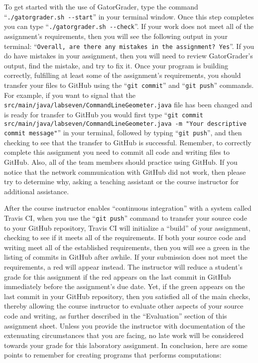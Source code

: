 \documentclass[11pt]{article}
\newcommand{\mainprogramsource}{\lstinline{src/main/java/labseven/CommandLineGeometer.java}}
\newcommand{\gatorgraderstart}{\command{./gatorgrader.sh --start}}
\newcommand{\gatorgradercheck}{\command{./gatorgrader.sh --check}}
\newcommand{\gitcommit}{\command{git commit}}
\newcommand{\gitpush}{\command{git push}}
\newcommand{\gitcommitmainprogram}{\command{git commit src/main/java/labseven/CommandLineGeometer.java -m "Your
descriptive commit message"}}
\newcommand{\command}[1]{``\lstinline{#1}''}
\newcommand{\step}[1]{``{#1}''}
\newcommand{\checkmark}{\ding{51}}
\newcommand{\naughtmark}{\ding{55}}
\begin{document}
To get started with the use of GatorGrader, type the command \gatorgraderstart{} in your terminal window. Once this step
completes you can type \gatorgradercheck{}. If your work does not meet all of the assignment's requirements, then you
will see the following output in your terminal: \command{Overall, are there any mistakes in the assignment? Yes}. If you
do have mistakes in your assignment, then you will need to review GatorGrader's output, find the mistake, and try to fix
it. Once your program is building correctly, fulfilling at least some of the assignment's requirements, you should
transfer your files to GitHub using the \gitcommit{} and \gitpush{} commands. For example, if you want to signal that
the \mainprogramsource{} file has been changed and is ready for transfer to GitHub you would first type
\gitcommitmainprogram{} in your terminal, followed by typing \gitpush{}, and then checking to see that the transfer to
GitHub is successful. Remember, to correctly complete this assignment you need to commit all code and writing files to
GitHub. Also, all of the team members should practice using GitHub. If you notice that the network communication with
GitHub did not work, then please try to determine why, asking a teaching assistant or the course instructor for
additional assistance.

After the course instructor enables \step{continuous integration} with a system called Travis CI, when you use the
\gitpush{} command to transfer your source code to your GitHub repository, Travis CI will initialize a \step{build} of
your assignment, checking to see if it meets all of the requirements. If both your source code and writing meet all of
the established requirements, then you will see a green \checkmark{} in the listing of commits in GitHub after awhile.
If your submission does not meet the requirements, a red \naughtmark{} will appear instead. The instructor will reduce a
student's grade for this assignment if the red \naughtmark{} appears on the last commit in GitHub immediately before the
assignment's due date. Yet, if the green \checkmark{} appears on the last commit in your GitHub repository, then you
satisfied all of the main checks, thereby allowing the course instructor to evaluate other aspects of your source code
and writing, as further described in the \step{Evaluation} section of this assignment sheet. Unless you provide the
instructor with documentation of the extenuating circumstances that you are facing, no late work will be considered
towards your grade for this laboratory assignment. In conclusion, here are some points to remember for creating programs
that performs computations:
\end{document}
